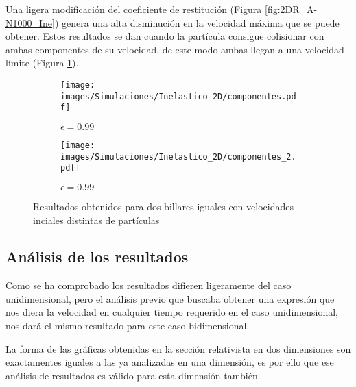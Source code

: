\documentclass[11pt, spanish]{book}
\begin{document}
Una ligera modificación del coeficiente de restitución (Figura \ref{fig:2DR_A-N1000_Ine}) genera una alta disminución en la velocidad máxima que se puede obtener. Estos resultados se dan cuando la partícula consigue colisionar con ambas componentes de su velocidad, de este modo ambas llegan a una velocidad límite (Figura \ref{fig:2DR_A-N1000_Ine_velocidades}).

\begin{figure}[H]
    \begin{subfigure}[b]{0.5\textwidth}
        \centering
        \texttt{[image: images/Simulaciones/Inelastico\_2D/componentes.pdf]}
        \caption{\( \epsilon = 0.99 \)}
    \end{subfigure}
    \hfill
    \begin{subfigure}[b]{0.5\textwidth}
        \centering
        \texttt{[image: images/Simulaciones/Inelastico\_2D/componentes\_2.pdf]}
        \caption{\( \epsilon = 0.99 \)}
    \end{subfigure}
    \caption{Resultados obtenidos para dos billares iguales con velocidades inciales distintas de partículas}
    \label{fig:2DR_A-N1000_Ine_velocidades}
\end{figure}

\subsection{Análisis de los resultados}

Como se ha comprobado los resultados difieren ligeramente del caso unidimensional, pero el análisis previo que buscaba obtener una expresión que nos diera la velocidad en cualquier tiempo requerido en el caso unidimensional, nos dará el mismo resultado para este caso bidimensional. 

\vspace{3mm}

La forma de las gráficas obtenidas en la sección relativista en dos dimensiones son exactamentes iguales a las ya analizadas en una dimensión, es por ello que ese análisis de resultados es válido para esta dimensión también. 
\end{document}
